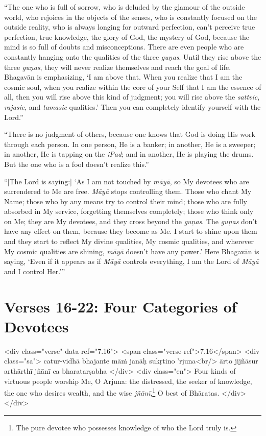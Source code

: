 \enquote{The one who is full of sorrow, who is deluded by the glamour of the outside world, who rejoices in the objects of the senses, who is constantly focused on the outside reality, who is always longing for outward perfection, can’t perceive true perfection, true knowledge, the glory of God, the mystery of God, because the mind is so full of doubts and misconceptions. There are even people who are constantly hanging onto the qualities of the three \textit{guṇas}. Until they rise above the three \textit{guṇas}, they will never realize themselves and reach the goal of life. Bhagavān is emphasizing, \enquote{I am above that. When you realize that I am the cosmic soul, when you realize within the core of your Self that I am the essence of all, then you will rise above this kind of judgment; you will rise above the \textit{sattvic}, \textit{rajasic}, and \textit{tamasic} qualities.} Then you can completely identify yourself with the Lord.}

\enquote{There is no judgment of others, because one knows that God is doing His work through each person. In one person, He is a banker; in another, He is a sweeper; in another, He is tapping on the \textit{iPad}; and in another, He is playing the drums. But the one who is a fool doesn’t realize this.}

\enquote{[The Lord is saying:] \enquote{As I am not touched by \textit{māyā}, so My devotees who are surrendered to Me are free. \textit{Māyā} stops controlling them. Those who chant My Name; those who by any means try to control their mind; those who are fully absorbed in My service, forgetting themselves completely; those who think only on Me; they are My devotees, and they cross beyond the \textit{guṇas}. The \textit{guṇas} don’t have any effect on them, because they become as Me. I start to shine upon them and they start to reflect My divine qualities, My cosmic qualities, and wherever My cosmic qualities are shining, \textit{māyā} doesn’t have any power.} Here Bhagavān is saying, \enquote{Even if it appears as if \textit{Māyā} controls everything, I am the Lord of \textit{Māyā} and I control Her.}}

\section{Verses 16-22: Four Categories of Devotees}\label{sec-verses-16-22-four-categories-of-devotees}


\begin{html}
<div class="verse" data-ref="7.16">
  <span class="verse-ref">7.16</span>
  <div class="sa">
    catur-vidhā bhajante māṁ janāḥ sukṛtino ’rjuna<br/>
    ārto jijñāsur arthārthī jñānī ca bharatarṣabha
  </div>
  <div class="en">
    Four kinds of virtuous people worship Me, O Arjuna: the distressed, the seeker of knowledge, the one who desires wealth, and the wise \textit{jñānī},\footnote{The pure devotee who possesses knowledge of who the Lord truly is.} O best of Bhāratas.
  </div>
</div>
\end{html}



